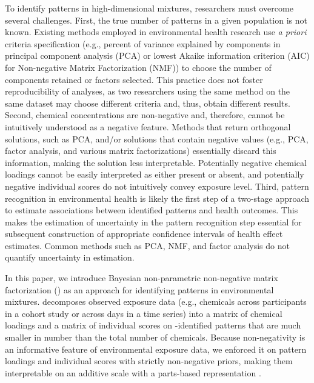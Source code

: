 To identify patterns in high-dimensional mixtures, researchers must overcome several challenges. First, the true number of patterns in a given population is not known. Existing methods employed in environmental health research use \textit{a priori} criteria specification (e.g., percent of variance explained by components in principal component analysis (PCA) or lowest Akaike information criterion (AIC) for Non-negative Matrix Factorization (NMF)) to choose the number of components retained or factors selected. This practice does not foster reproducibility of analyses, as two researchers using the same method on the same dataset may choose different criteria and, thus, obtain different results. Second, chemical concentrations are non-negative and, therefore, cannot be intuitively understood as a negative feature. Methods that return orthogonal solutions, such as PCA, and/or solutions that contain negative values (e.g., PCA, factor analysis, and various matrix factorizations) essentially discard this information, making the solution less interpretable. Potentially negative chemical loadings cannot be easily interpreted as either present or absent, and potentially negative individual scores do not intuitively convey exposure level. Third, pattern recognition in environmental health is likely the first step of a two-stage approach to estimate associations between identified patterns and health outcomes. This makes the estimation of uncertainty in the pattern recognition step essential for subsequent construction of appropriate confidence intervals of health effect estimates. Common methods such as PCA, NMF, and factor analysis do not quantify uncertainty in estimation.

In this paper, we introduce Bayesian non-parametric non-negative matrix factorization (\bnmfc) as an approach for identifying patterns in environmental mixtures. \bnmf decomposes observed exposure data (e.g., chemicals across participants in a cohort study or across days in a time series) into a matrix of chemical loadings and a matrix of individual scores on \bnmfc-identified patterns that are much smaller in number than the total number of chemicals. Because non-negativity is an informative feature of environmental exposure data, we enforced it on pattern loadings and individual scores with strictly non-negative priors, making them interpretable on an additive scale with a parts-based representation \cite{lee1999learning}.

